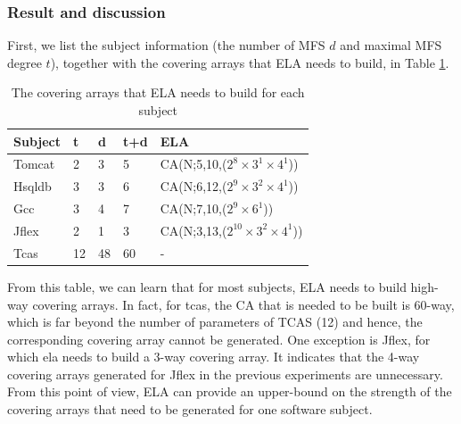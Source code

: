 \documentclass[journal,12pt,onecolumn,draftclsnofoot,]{IEEEtran}
\begin{document}

\subsubsection{Result and discussion}
First, we list the subject information (the number of MFS $d$ and maximal MFS degree $t$), together with the covering arrays that ELA needs to build, in Table \ref{ela-needs-to-gen}.

\begin{table}[htbp]
\center
\caption{The covering arrays that ELA needs to build for each subject}
\label{ela-needs-to-gen}
\begin{tabular}{|l|l|l|l|l|}
\hline
Subject & t  & d  & t+d & ELA                       \\\hline
Tomcat  & 2  & 3  & 5   & CA(N;5,10,($2^{8} \times 3^{1} \times 4^{1}$))  \\
Hsqldb  & 3  & 3  & 6   & CA(N;6,12,($2^{9} \times 3^{2} \times 4^{1}$))  \\
Gcc     & 3  & 4  & 7   & CA(N;7,10,($2^{9} \times 6^{1}$))      \\
Jflex   & 2  & 1  & 3   & CA(N;3,13,($2^{10} \times 3^{2} \times 4^{1}$)) \\
Tcas    & 12 & 48 & 60  & -      \\ \hline
\end{tabular}
\end{table}
From this table, we can learn that for most subjects, ELA needs to build high-way covering arrays. In fact, for tcas, the CA that is needed to be built is 60-way, which is far beyond the number of parameters of TCAS (12) and hence, the corresponding covering array cannot be generated. One exception is Jflex, for which ela needs to build a 3-way covering array. It indicates that the 4-way covering arrays generated for Jflex in the previous experiments are unnecessary. From this point of view, ELA can provide an upper-bound on the strength of the covering arrays that need to be generated for one software subject.
\end{document}
